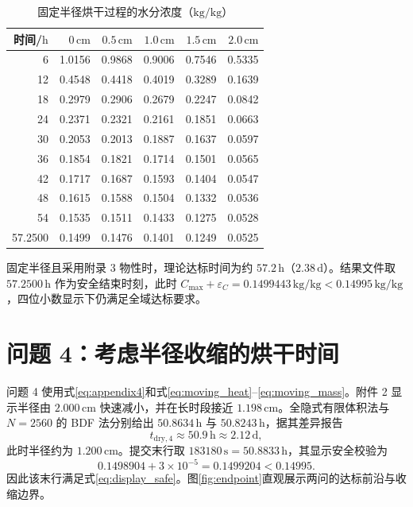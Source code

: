 \documentclass[UTF8,a4paper,zihao=-4,fontset=fandol]{ctexart}
\newcommand{\unit}[1]{\,\mathrm{#1}}
\begin{document}
\begin{table}[H]
\centering
\caption{固定半径烘干过程的水分浓度（$\mathrm{kg/kg}$）}
\label{tab:q3}
\small
\begin{tabular}{rrrrrr}
\toprule
时间/$\mathrm{h}$ & $0\unit{cm}$ & $0.5\unit{cm}$ & $1.0\unit{cm}$ & $1.5\unit{cm}$ & $2.0\unit{cm}$ \\
\midrule
6  & 1.0156 & 0.9868 & 0.9006 & 0.7546 & 0.5335 \\
12 & 0.4548 & 0.4418 & 0.4019 & 0.3289 & 0.1639 \\
18 & 0.2979 & 0.2906 & 0.2679 & 0.2247 & 0.0842 \\
24 & 0.2371 & 0.2321 & 0.2161 & 0.1851 & 0.0663 \\
30 & 0.2053 & 0.2013 & 0.1887 & 0.1637 & 0.0597 \\
36 & 0.1854 & 0.1821 & 0.1714 & 0.1501 & 0.0565 \\
42 & 0.1717 & 0.1687 & 0.1593 & 0.1404 & 0.0547 \\
48 & 0.1615 & 0.1588 & 0.1504 & 0.1332 & 0.0536 \\
54 & 0.1535 & 0.1511 & 0.1433 & 0.1275 & 0.0528 \\
57.2500 & 0.1499 & 0.1476 & 0.1401 & 0.1249 & 0.0525 \\
\bottomrule
\end{tabular}
\end{table}

固定半径且采用附录 3 物性时，理论达标时间为约 $57.2\unit{h}$（$2.38\unit{d}$）。结果文件取 $57.2500\unit{h}$ 作为安全结束时刻，此时 $C_{\max}+\varepsilon_C=0.1499443\unit{kg/kg}<0.14995\unit{kg/kg}$，四位小数显示下仍满足全域达标要求。


\section{问题 4：考虑半径收缩的烘干时间}

问题 4 使用式\eqref{eq:appendix4}和式\eqref{eq:moving_heat}--\eqref{eq:moving_mass}。附件 2 显示半径由 $2.000\unit{cm}$ 快速减小，并在长时段接近 $1.198\unit{cm}$。全隐式有限体积法与 $N=2560$ 的 BDF 法分别给出 $50.8634\unit{h}$ 与 $50.8243\unit{h}$，据其差异报告
\begin{equation}
t_{\mathrm{dry},4}\approx50.9\unit{h}\approx2.12\unit{d},
\end{equation}
此时半径约为 $1.200\unit{cm}$。提交末行取 $183180\unit{s}=50.8833\unit{h}$，其显示安全校验为
\begin{equation}
0.1498904+3\times10^{-5}=0.1499204<0.14995.
\end{equation}
因此该末行满足式\eqref{eq:display_safe}。图\ref{fig:endpoint}直观展示两问的达标前沿与收缩边界。
\end{document}
